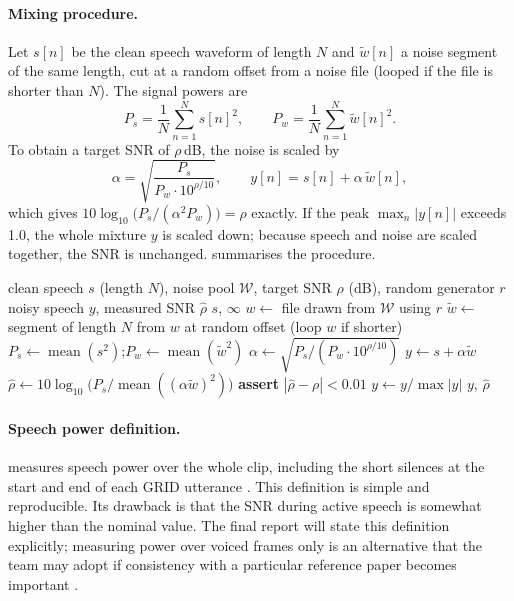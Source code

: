 \paragraph{Mixing procedure.}
Let $s[n]$ be the clean speech waveform of length $N$ and $\tilde{w}[n]$ a noise
segment of the same length, cut at a random offset from a noise file (looped if
the file is shorter than $N$). The signal powers are
\begin{equation}
P_s = \frac{1}{N}\sum_{n=1}^{N} s[n]^2, \qquad
P_w = \frac{1}{N}\sum_{n=1}^{N} \tilde{w}[n]^2 .
\label{eq:power}
\end{equation}
To obtain a target SNR of $\rho$\,dB, the noise is scaled by
\begin{equation}
\alpha = \sqrt{\frac{P_s}{P_w \cdot 10^{\rho/10}}},
\qquad
y[n] = s[n] + \alpha\,\tilde{w}[n],
\label{eq:mix}
\end{equation}
which gives $10\log_{10}\!\big(P_s / (\alpha^2 P_w)\big) = \rho$ exactly. If
the peak $\max_n |y[n]|$ exceeds 1.0, the whole mixture $y$ is scaled down;
because speech and noise are scaled together, the SNR is unchanged.
 summarises the procedure.

\begin{algorithm}[H]
\caption{Mixing noise into clean speech at a target SNR.}
\label{alg:mix}
\begin{algorithmic}[1]
\Require clean speech $s$ (length $N$), noise pool $\mathcal{W}$, target SNR $\rho$ (dB), random generator $r$
\Ensure noisy speech $y$, measured SNR $\hat{\rho}$
 \Return $s$, $\infty$ \EndIf
\State $w \gets$ file drawn from $\mathcal{W}$ using $r$
\State $\tilde{w} \gets$ segment of length $N$ from $w$ at random offset (loop $w$ if shorter)
\State $P_s \gets \operatorname{mean}(s^2)$;\quad $P_w \gets \operatorname{mean}(\tilde{w}^2)$
\State $\alpha \gets \sqrt{P_s / (P_w \cdot 10^{\rho/10})}$
\State $y \gets s + \alpha\tilde{w}$
\State $\hat{\rho} \gets 10\log_{10}\!\big(P_s / \operatorname{mean}((\alpha\tilde{w})^2)\big)$ 
\State \textbf{assert} $|\hat{\rho} - \rho| < 0.01$
 $y \gets y / \max|y|$ \EndIf
\State \Return $y$, $\hat{\rho}$
\end{algorithmic}
\end{algorithm}

\paragraph{Speech power definition.}
 measures speech power over the whole clip, including the short
silences at the start and end of each GRID utterance \rec. This definition is
simple and reproducible. Its drawback is that the SNR during active speech is
somewhat higher than the nominal value. The final report will state this
definition explicitly; measuring power over voiced frames only is an
alternative that the team may adopt if consistency with a particular reference
paper becomes important \tbd.

